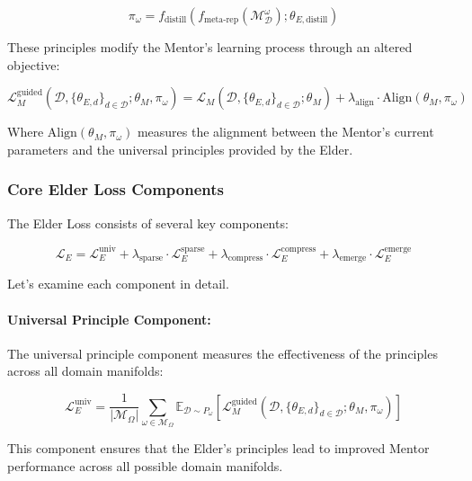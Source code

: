 \begin{equation}
\pi_{\omega} = f_{\text{distill}}(f_{\text{meta-rep}}(\mathcal{M}_{\mathcal{D}}^{\omega}); \theta_{E,\text{distill}})
\end{equation}

These principles modify the Mentor's learning process through an altered objective:

\begin{equation}
\mathcal{L}_{M}^{\text{guided}}(\mathcal{D}, \{\theta_{E,d}\}_{d \in \mathcal{D}}; \theta_M, \pi_{\omega}) = \mathcal{L}_M(\mathcal{D}, \{\theta_{E,d}\}_{d \in \mathcal{D}}; \theta_M) + \lambda_{\text{align}} \cdot \text{Align}(\theta_M, \pi_{\omega})
\end{equation}

Where $\text{Align}(\theta_M, \pi_{\omega})$ measures the alignment between the Mentor's current parameters and the universal principles provided by the Elder.

\subsubsection{Core Elder Loss Components}

The Elder Loss consists of several key components:

\begin{equation}
\mathcal{L}_E = \mathcal{L}_E^{\text{univ}} + \lambda_{\text{sparse}} \cdot \mathcal{L}_E^{\text{sparse}} + \lambda_{\text{compress}} \cdot \mathcal{L}_E^{\text{compress}} + \lambda_{\text{emerge}} \cdot \mathcal{L}_E^{\text{emerge}}
\end{equation}

Let's examine each component in detail.

\paragraph{Universal Principle Component:}
The universal principle component measures the effectiveness of the principles across all domain manifolds:

\begin{equation}
\mathcal{L}_E^{\text{univ}} = \frac{1}{|\mathcal{M}_{\Omega}|} \sum_{\omega \in \mathcal{M}_{\Omega}} \mathbb{E}_{\mathcal{D} \sim P_{\omega}} [\mathcal{L}_{M}^{\text{guided}}(\mathcal{D}, \{\theta_{E,d}\}_{d \in \mathcal{D}}; \theta_M, \pi_{\omega})]
\end{equation}

This component ensures that the Elder's principles lead to improved Mentor performance across all possible domain manifolds.

